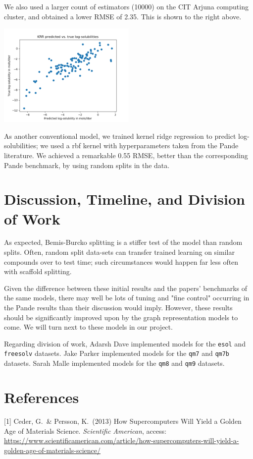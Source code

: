 \documentclass{article}
\begin{document}
We also used a larger count of estimators (10000) on the CIT Arjuna computing cluster, and obtained a lower RMSE of 2.35. This is shown to the right above.

\includegraphics[width=0.5\textwidth]{krr1}

As another conventional model, we trained kernel ridge regression to predict log-solubilities; we used a rbf kernel with hyperparameters taken from the Pande literature. We achieved a remarkable 0.55 RMSE, better than the corresponding Pande benchmark, by using random splits in the data.

\section{Discussion, Timeline, and Division of Work}

As expected, Bemis-Burcko splitting is a stiffer test of the model than random splits. Often, random split data-sets can transfer trained learning on similar compounds over to test time; such circumstances would happen far less often with scaffold splitting.

Given the difference between these initial results and the papers' benchmarks of the same models, there may well be lots of tuning and "fine control" occurring in the Pande results than their discussion would imply. However, these results should be significantly improved upon by the graph representation models to come. We will turn next to these models in our project.

Regarding division of work, Adarsh Dave implemented models for the \texttt{esol} and \texttt{freesolv} datasets. Jake Parker implemented models for the \texttt{qm7} and \texttt{qm7b} datasets. Sarah Malle implemented models for the \texttt{qm8} and \texttt{qm9} datasets.

\section*{References}
\small
[1] Ceder, G.\ \& Persson, K.\ (2013) How Supercomputers Will Yield a Golden Age of Materials Science. {\it Scientific American}, access: \url{https://www.scientificamerican.com/article/how-supercomputers-will-yield-a-golden-age-of-materials-science/}
\end{document}
